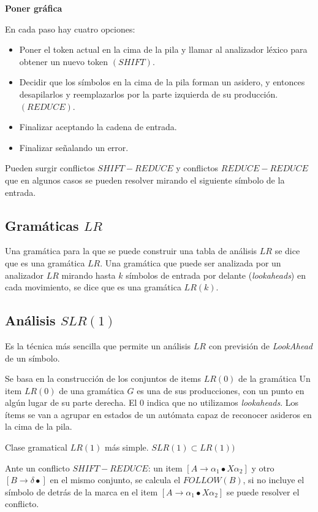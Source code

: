                  \textbf{Poner gráfica}
                 
En cada paso hay cuatro opciones:
\begin{itemize}
	\item Poner el token actual en la cima de la pila y llamar al analizador léxico para obtener un nuevo token $(SHIFT)$.
	\item Decidir que los símbolos en la cima de la pila forman un asidero, y entonces desapilarlos y reemplazarlos por la parte izquierda de su producción. $(REDUCE)$.
	\item Finalizar aceptando la cadena de entrada.
	\item Finalizar señalando un error.
\end{itemize}

Pueden surgir conflictos $SHIFT-REDUCE$ y conflictos $REDUCE-REDUCE$ que en algunos casos se pueden resolver mirando el siguiente símbolo de la entrada.

\subsection{Gramáticas  $LR$}

Una gramática para la que se puede construir una tabla de análisis $LR$ se dice que es una gramática $LR$. Una gramática que puede ser analizada por un analizador $LR$ mirando hasta $k$ símbolos de entrada por delante (\textit{lookaheads}) en cada movimiento, se dice que es una gramática $LR(k)$.

\subsection{Análisis $SLR(1)$}

Es la técnica más sencilla que permite un análisis $LR$ con previsión de \textit{LookAhead} de un símbolo.

Se basa en la construcción de los conjuntos de items $LR(0)$ de la gramática
Un item $LR(0)$ de una gramática $G$ es una de sus producciones, con un punto en algún lugar de su parte derecha. El 0 indica que no utilizamos \textit{lookaheads}.
Los ítems se van a agrupar en estados de un autómata capaz de reconocer asideros en la cima de la pila.


Clase gramatical $LR(1)$ más simple. $SLR(1)\subset LR(1))$

Ante un conflicto $SHIFT-REDUCE$: un item $[A\rightarrow\alpha_{1}\bullet X\alpha_{2} ]$ y otro $[B\rightarrow\delta\bullet ]$ en el mismo conjunto, se calcula el $FOLLOW(B)$, si no incluye el símbolo de detrás de la marca en el item $[A\rightarrow\alpha_{1}\bullet X\alpha_{2}]$ se puede resolver el conflicto.

